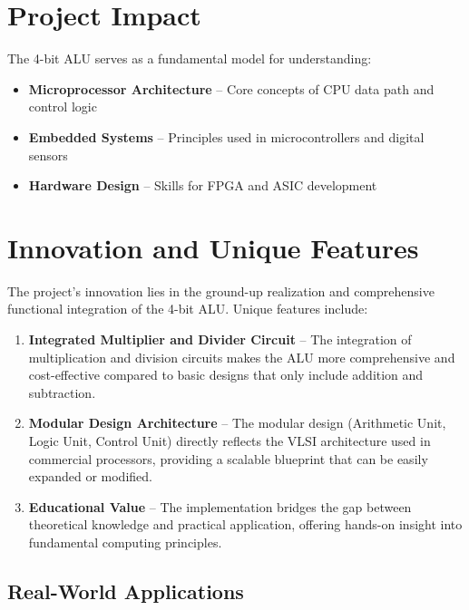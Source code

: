 \section{Project Impact}

The 4-bit ALU serves as a fundamental model for understanding:
\begin{itemize}
    \item \textbf{Microprocessor Architecture} -- Core concepts of CPU data path and control logic
    \item \textbf{Embedded Systems} -- Principles used in microcontrollers and digital sensors
    \item \textbf{Hardware Design} -- Skills for FPGA and ASIC development
\end{itemize}

\section{Innovation and Unique Features}

The project's innovation lies in the ground-up realization and comprehensive functional integration of the 4-bit ALU. Unique features include:

\begin{enumerate}
    \item \textbf{Integrated Multiplier and Divider Circuit} -- The integration of multiplication and division circuits makes the ALU more comprehensive and cost-effective compared to basic designs that only include addition and subtraction.
    
    \item \textbf{Modular Design Architecture} -- The modular design (Arithmetic Unit, Logic Unit, Control Unit) directly reflects the VLSI architecture used in commercial processors, providing a scalable blueprint that can be easily expanded or modified.
    
    \item \textbf{Educational Value} -- The implementation bridges the gap between theoretical knowledge and practical application, offering hands-on insight into fundamental computing principles.
\end{enumerate}

\subsection{Real-World Applications}

